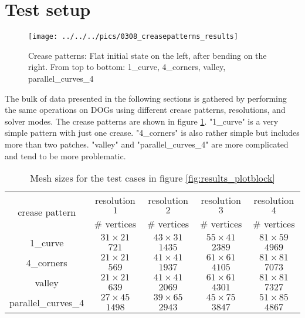 \documentclass[a4paper,twoside,12pt,nochapterprefix]{scrbook}
\begin{document}
\section{Test setup}
\begin{figure}
    \centering
    \texttt{[image: ../../../pics/0308\_creasepatterns\_results]}
    \caption{Crease patterns: Flat initial state on the left, after bending on the right. From top to bottom: 1\_curve, 4\_corners, valley, parallel\_curves\_4}
    \label{fig:creasepatterns}
\end{figure}
The bulk of data presented in the following sections is gathered by performing the same operations on DOGs using different crease patterns, resolutions, and solver modes. The crease patterns are shown in figure \ref{fig:creasepatterns}. "1\_curve" is a very simple pattern with just one crease. "4\_corners" is also rather simple but includes more than two patches. "valley" and "parallel\_curves\_4" are more complicated and tend to be more problematic.\newline
\begin{table}
\centering
\begin{tabular}{|c|c|c|c|c|}
\hline
\multirow{2}{*}{crease pattern} & resolution $1$ & resolution $2$ & resolution $3$ & resolution $4$ \\ \cline{2-5}
 & \# vertices & \# vertices & \# vertices & \# vertices \\ \hline
 
\multirow{2}{*}{1\_curve} & $31 \times 21$ & $43 \times 31$ & $55 \times 41$ & $81 \times 59$ \\ \cline{2-5}
 & $721$ & $1435$ & $2389$ & $4969$ \\ \hline
\multirow{2}{*}{4\_corners} & $21 \times 21$ & $41 \times 41$ & $61 \times 61$ & $81 \times 81$ \\ \cline{2-5}
 & $569$ & $1937$ & $4105$ & $7073$ \\ \hline
\multirow{2}{*}{valley} & $21 \times 21$ & $41 \times 41$ & $61 \times 61$ & $81 \times 81$ \\ \cline{2-5}
 & $639$ & $2069$ & $4301$ & $7327$ \\ \hline
\multirow{2}{*}{parallel\_curves\_4} & $27 \times 45$ & $39 \times 65$ & $45 \times 75$ & $51 \times 85$ \\ \cline{2-5}
 & $1498$ & $2943$ & $3847$ & $4867$ \\ \hline
\end{tabular}
\caption{Mesh sizes for the test cases in figure \ref{fig:results_plotblock}}
\label{tab:res_and_vnum}
\end{table}
\end{document}
